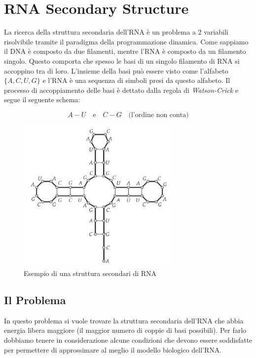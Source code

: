 \section{RNA Secondary Structure }

La ricerca della struttura secondaria dell'RNA è un problema a 2 variabili
risolvibile tramite il paradigma della programmazione dinamica. Come sappiamo il
DNA è composto da due filamenti, mentre l'RNA è composto da un filamento
singolo. Questo comporta che spesso le basi di un singolo filamento di RNA si
accoppino tra di loro. L'insieme della basi può essere visto come l'alfabeto
$\{A, C, U, G\}$ e l'RNA è una sequenza di simboli presi da questo alfabeto. Il
processo di accoppiamento delle basi è dettato dalla regola di \textit{Watson-Crick} e
segue il seguente schema:

\[
    A - U \ \ \ \textrm{ e } \ \ \ C - G \ \ \ \textrm{ (l'ordine non conta)}
\]

\begin{figure}[H]
    \centering
    \includegraphics[width=8cm, keepaspectratio]{capitoli/dynamic_programming/imgs/rna_esempio1.png}
    \caption{Esempio di una struttura secondari di RNA} %
\end{figure}

\subsection{Il Problema}

In questo problema si vuole trovare la struttura secondaria dell'RNA che abbia
energia libera maggiore (il maggior numero di coppie di basi possibili). Per
farlo dobbiamo tenere in considerazione alcune condizioni che devono essere
soddisfatte per permettere di approssimare al meglio il modello biologico
dell'RNA.\\

